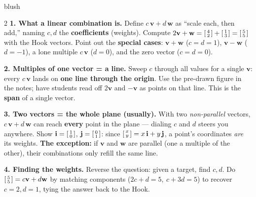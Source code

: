 \documentclass[10pt]{article}
\newcommand{\vv}{\mathbf{v}}
\newcommand{\ww}{\mathbf{w}}
\begin{document}
\begin{skillbox}[Lesson]{blush}
\begin{multicols}{2}
\textbf{1. What a linear combination is.} Define $c\,\vv+d\,\ww$ as ``scale each, then add,''
naming $c,d$ the \textbf{coefficients} (weights). Compute
$2\vv+\ww=\begin{bsmallmatrix} 4\\2 \end{bsmallmatrix}+\begin{bsmallmatrix} 1\\3 \end{bsmallmatrix}=\begin{bsmallmatrix} 5\\5 \end{bsmallmatrix}$
with the Hook vectors. Point out the \textbf{special cases}: $\vv+\ww$ ($c=d=1$), $\vv-\ww$
($d=-1$), a lone multiple $c\,\vv$ ($d=0$), and the zero vector ($c=d=0$).

\textbf{2. Multiples of one vector = a line.} Sweep $c$ through all values for a single
$\vv$: every $c\,\vv$ lands on \textbf{one line through the origin}. Use the pre-drawn figure
in the notes; have students read off $2\vv$ and $-\vv$ as points on that line. This is the
\textbf{span} of a single vector.

\columnbreak

\textbf{3. Two vectors = the whole plane (usually).} With two \emph{non-parallel} vectors,
$c\,\vv+d\,\ww$ can reach \textbf{every} point in the plane --- dialing $c$ and $d$ steers you
anywhere. Show $\mathbf{i}=\begin{bsmallmatrix} 1\\0 \end{bsmallmatrix}$,
$\mathbf{j}=\begin{bsmallmatrix} 0\\1 \end{bsmallmatrix}$: since
$\begin{bsmallmatrix} x\\y \end{bsmallmatrix}=x\,\mathbf{i}+y\,\mathbf{j}$, a point's
coordinates \emph{are} its weights. \textbf{The exception:} if $\vv$ and $\ww$ are parallel
(one a multiple of the other), their combinations only refill the same line.

\textbf{4. Finding the weights.} Reverse the question: given a target, find $c,d$. Do
$\begin{bsmallmatrix} 5\\5 \end{bsmallmatrix}=c\vv+d\ww$ by matching components
($2c+d=5,\ c+3d=5$) to recover $c=2,d=1$, tying the answer back to the Hook.
\end{multicols}
\end{skillbox}
\end{document}
